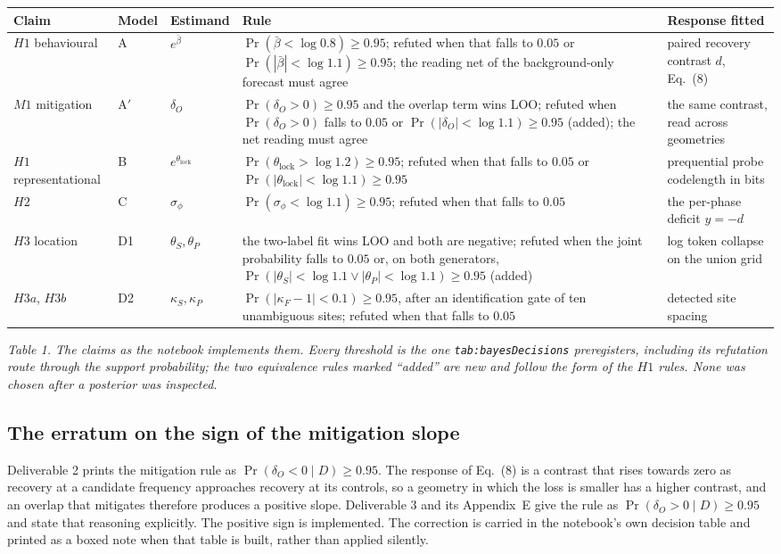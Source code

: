 \documentclass[10pt,a4paper]{article}
\newcommand{\code}[1]{\texttt{\UseBreakableUnderscores #1}}
\newcommand{\UseBreakableUnderscores}{\def\_{\textunderscore\allowbreak}}
\begin{document}
\begin{center}\small
\begin{tabularx}{\textwidth}{@{}L{2.3cm}L{0.8cm}L{1.6cm}YL{3.5cm}@{}}
\toprule
\textbf{Claim} & \textbf{Model} & \textbf{Estimand} & \textbf{Rule} & \textbf{Response fitted}\\
\midrule
$H1$ behavioural & A & $e^{\bar\beta}$ & $\Pr(\bar\beta<\log0.8)\ge0.95$; refuted when that falls to $0.05$ or $\Pr(|\bar\beta|<\log1.1)\ge0.95$; the reading net of the background-only forecast must agree & paired recovery contrast $d$, Eq.~(8)\\
$M1$ mitigation & A$'$ & $\delta_O$ & $\Pr(\delta_O>0)\ge0.95$ and the overlap term wins LOO; refuted when $\Pr(\delta_O>0)$ falls to $0.05$ or $\Pr(|\delta_O|<\log1.1)\ge0.95$ (added); the net reading must agree & the same contrast, read across geometries\\
$H1$ representational & B & $e^{\theta_{\mathrm{lock}}}$ & $\Pr(\theta_{\mathrm{lock}}>\log1.2)\ge0.95$; refuted when that falls to $0.05$ or $\Pr(|\theta_{\mathrm{lock}}|<\log1.1)\ge0.95$ & prequential probe codelength in bits\\
$H2$ & C & $\sigma_\phi$ & $\Pr(\sigma_\phi<\log1.1)\ge0.95$; refuted when that falls to $0.05$ & the per-phase deficit $y=-d$\\
$H3$ location & D1 & $\theta_S,\theta_P$ & the two-label fit wins LOO and both are negative; refuted when the joint probability falls to $0.05$ or, on both generators, $\Pr(|\theta_S|<\log1.1\lor|\theta_P|<\log1.1)\ge0.95$ (added) & log token collapse on the union grid\\
$H3a$, $H3b$ & D2 & $\kappa_S,\kappa_P$ & $\Pr(|\kappa_F-1|<0.1)\ge0.95$, after an identification gate of ten unambiguous sites; refuted when that falls to $0.05$ & detected site spacing\\
\bottomrule
\end{tabularx}
\end{center}
{\small\itshape Table 1. The claims as the notebook implements them. Every threshold is the one \code{tab:bayesDecisions} preregisters, including its refutation route through the support probability; the two equivalence rules marked ``added'' are new and follow the form of the $H1$ rules. None was chosen after a posterior was inspected.}

\subsection{The erratum on the sign of the mitigation slope}
Deliverable 2 prints the mitigation rule as $\Pr(\delta_O<0\mid D)\ge0.95$. The response of Eq.~(8) is a contrast that rises towards zero as recovery at a candidate frequency approaches recovery at its controls, so a geometry in which the loss is smaller has a higher contrast, and an overlap that mitigates therefore produces a positive slope. Deliverable 3 and its Appendix~E give the rule as $\Pr(\delta_O>0\mid D)\ge0.95$ and state that reasoning explicitly. The positive sign is implemented. The correction is carried in the notebook's own decision table and printed as a boxed note when that table is built, rather than applied silently.
\end{document}

